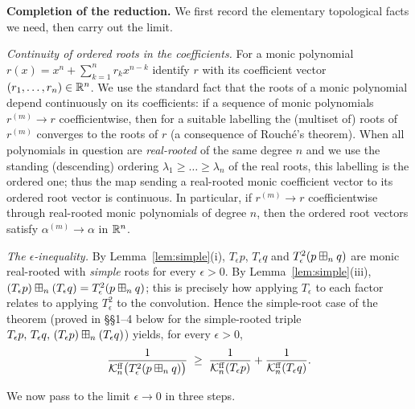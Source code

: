 \noindent\textbf{Completion of the reduction.}
We first record the elementary topological facts we need, then carry out the
limit.

\medskip
\noindent\textit{Continuity of ordered roots in the coefficients.}
For a monic polynomial $r(x)=x^n+\sum_{k=1}^n r_k x^{n-k}$ identify $r$ with its
coefficient vector $(r_1,\dots,r_n)\in\mathbb{R}^n$. We use the standard fact that
the roots of a monic polynomial depend continuously on its coefficients: if a
sequence of monic polynomials $r^{(m)}\to r$ coefficientwise, then for a suitable
labelling the (multiset of) roots of $r^{(m)}$ converges to the roots of $r$
\cite[Ch.~II, App.~A]{Whitney} (a consequence of Rouch\'e's theorem). When all
polynomials in question are \emph{real-rooted} of the same degree $n$ and we use
the standing (descending) ordering $\lambda_1\ge\dots\ge\lambda_n$ of the real
roots, this labelling is the ordered one; thus the map sending a real-rooted monic
coefficient vector to its ordered root vector is continuous. In particular, if
$r^{(m)}\to r$ coefficientwise through real-rooted monic polynomials of degree
$n$, then the ordered root vectors satisfy $\alpha^{(m)}\to\alpha$ in $\mathbb{R}^n$.

\medskip
\noindent\textit{The $\epsilon$-inequality.}
By Lemma~\ref{lem:simple}(i), $T_\epsilon p$, $T_\epsilon q$ and
$T_\epsilon^2(p\boxplus_n q)$ are monic real-rooted with \emph{simple} roots for
every $\epsilon>0$. By Lemma~\ref{lem:simple}(iii),
$(T_\epsilon p)\boxplus_n(T_\epsilon q)=T_\epsilon^2(p\boxplus_n q)$; this is precisely
how applying $T_\epsilon$ to each factor relates to applying $T_\epsilon^2$ to the
convolution. Hence the simple-root case of the theorem (proved in §§1--4 below
for the simple-rooted triple $T_\epsilon p,\,T_\epsilon q,\,(T_\epsilon p)\boxplus_n(T_\epsilon q)$)
yields, for every $\epsilon>0$,
\begin{equation}\label{eq:eps-ineq}
\frac{1}{\mathcal{K}^{\mathrm{ff}}_n\bigl(T_\epsilon^2(p\boxplus_n q)\bigr)}\;\ge\;
\frac{1}{\mathcal{K}^{\mathrm{ff}}_n(T_\epsilon p)}+\frac{1}{\mathcal{K}^{\mathrm{ff}}_n(T_\epsilon q)}.
\end{equation}

We now pass to the limit $\epsilon\to 0$ in three steps.

